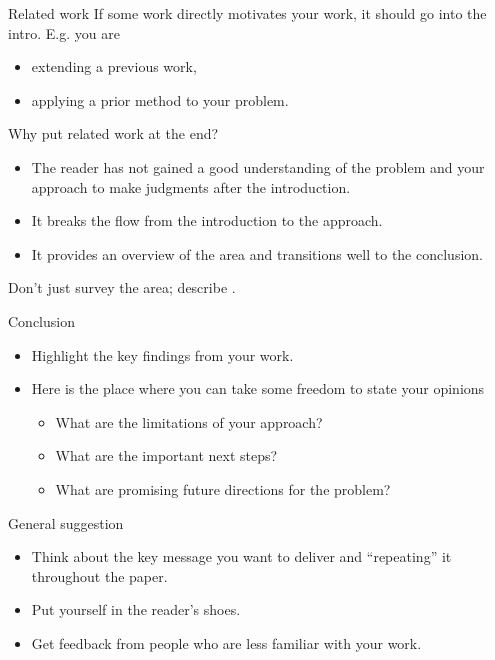 \documentclass[usenames,dvipsnames,11pt,aspectratio=169]{beamer}
\begin{document}
\begin{frame}
    {Related work}
    If some work directly motivates your work, it should go into the intro. E.g. you are\\
    \begin{itemize}
        \item extending a previous work,
        \item applying a prior method to your problem.
    \end{itemize}

    Why put related work at the end?\\
    \begin{itemize}
        \item The reader has not gained a good understanding of the problem and your approach to make judgments after the introduction.
        \item It breaks the flow from the introduction to the approach.
        \item It provides an overview of the area and transitions well to the conclusion.
    \end{itemize}

    Don't just survey the area; describe .
\end{frame}

\begin{frame}
    {Conclusion}
    \begin{itemize}
        \item Highlight the key findings from your work.
        \item Here is the place where you can take some freedom to state your opinions
            \begin{itemize}
                \item What are the limitations of your approach?
                \item What are the important next steps?
                \item What are promising future directions for the problem?
            \end{itemize}
    \end{itemize}
\end{frame}

\begin{frame}
    {General suggestion}
    \begin{itemize}
        \item Think about the key message you want to deliver and ``repeating'' it throughout the paper.
        \item Put yourself in the reader's shoes.
        \item Get feedback from people who are less familiar with your work.
    \end{itemize}
\end{frame}
\end{document}
